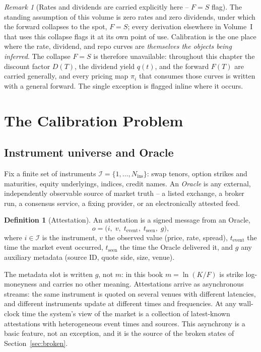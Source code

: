 \documentclass[11pt]{book}
\theoremstyle{plain}
\theoremstyle{definition}
\newtheorem{definition}[theorem]{Definition}
\theoremstyle{remark}
\newtheorem{remark}[theorem]{Remark}
\newcommand{\Ninstr}{N_{\mathrm{ins}}}           %
\begin{document}
\begin{remark}[Rates and dividends are carried explicitly here -- $F=S$ flag]
\label{rem:FS-flag}
The standing assumption of this volume is zero rates and zero dividends, under
which the forward collapses to the spot, $F=S$; every derivation elsewhere in
Volume~I that uses this collapse flags it at its own point of use. Calibration is
the one place where the rate, dividend, and repo curves are \emph{themselves
the objects being inferred}. The collapse $F=S$ is therefore unavailable:
throughout this chapter the discount
factor $D(T)$, the dividend yield $q(t)$, and the forward $F(T)$ are carried
generally, and every pricing map $\pi_i$ that consumes those curves is written
with a general forward. The single exception is flagged inline where it occurs.
\end{remark}

\section{The Calibration Problem}

\subsection{Instrument universe and Oracle}

Fix a finite set of instruments $\mathcal{I}=\{1,\dots,\Ninstr\}$: swap tenors,
option strikes and maturities, equity underlyings, indices, credit names. An
\emph{Oracle} is any external, independently observable source of market truth --
a listed exchange, a broker run, a consensus service, a fixing provider, or an
electronically attested feed.

\begin{definition}[Attestation]
An attestation is a signed message from an Oracle,
\[
    o = \bigl(i,\; v,\; t_{\text{event}},\; t_{\text{seen}},\; g\bigr),
\]
where $i\in\mathcal{I}$ is the instrument, $v$ the observed value (price, rate,
spread), $t_{\text{event}}$ the time the market event occurred, $t_{\text{seen}}$
the time the Oracle delivered it, and $g$ any auxiliary metadata (source ID,
quote side, size, venue).
\end{definition}

The metadata slot is written $g$, not $m$: in this book $m=\ln(K/F)$ is strike
log-moneyness and carries no other meaning. Attestations arrive as asynchronous
streams: the same instrument is quoted on several venues with different
latencies, and different instruments update at different times and frequencies.
At any wall-clock time the system's view of the market is a collection of
latest-known attestations with heterogeneous event times and sources. This
asynchrony is a basic feature, not an exception, and it is the source of the
broken states of Section~\ref{sec:broken}.
\end{document}
